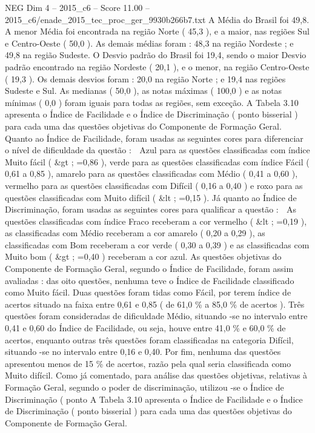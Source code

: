 \begin{textsample}{NEG Dim 4 – 2015\_c6 – Score 11.00 – 2015\_c6/enade\_2015\_tec\_proc\_ger\_9930b266b7.txt}
A Média do Brasil foi 49,8.
A menor Média foi encontrada na região Norte ( 45,3 ), e a maior, nas regiões Sul e Centro-Oeste ( 50,0 ).
As demais médias foram : 48,3 na região Nordeste ; e 49,8 na região Sudeste.
O Desvio padrão do Brasil foi 19,4, sendo o maior Desvio padrão encontrado na região Nordeste ( 20,1 ), e o menor, na região Centro-Oeste ( 19,3 ).
Os demais desvios foram : 20,0 na região Norte ; e 19,4 nas regiões Sudeste e Sul.
As medianas ( 50,0 ), as notas máximas ( 100,0 ) e as notas mínimas ( 0,0 ) foram iguais para todas as regiões, sem exceção.
A Tabela 3.10 apresenta o Índice de Facilidade e o Índice de Discriminação ( ponto bisserial ) para cada uma das questões objetivas do Componente de Formação Geral.
Quanto ao Índice de Facilidade, foram usadas as seguintes cores para diferenciar o nível de dificuldade da questão :  Azul para as questões classificadas com índice Muito fácil ( \&gt ; =0,86 ), verde para as questões classificadas com índice Fácil ( 0,61 a 0,85 ), amarelo para as questões classificadas com Médio ( 0,41 a 0,60 ), vermelho para as questões classificadas com Difícil ( 0,16 a 0,40 ) e roxo para as questões classificadas com Muito difícil ( \&lt ; =0,15 ).
Já quanto ao Índice de Discriminação, foram usadas as seguintes cores para qualificar a questão :  As questões classificadas com índice Fraco receberam a cor vermelho ( \&lt ; =0,19 ), as classificadas com Médio receberam a cor amarelo ( 0,20 a 0,29 ), as classificadas com Bom receberam a cor verde ( 0,30 a 0,39 ) e as classificadas com Muito bom ( \&gt ; =0,40 ) receberam a cor azul.
As questões objetivas do Componente de Formação Geral, segundo o Índice de Facilidade, foram assim avaliadas : das oito questões, nenhuma teve o Índice de Facilidade classificado como Muito fácil.
Duas questões foram tidas como Fácil, por terem índice de acertos situado na faixa entre 0,61 e 0,85 ( de 61,0 \% a 85,0 \% de acertos ).
Três questões foram consideradas de dificuldade Médio, situando -se no intervalo entre 0,41 e 0,60 do Índice de Facilidade, ou seja, houve entre 41,0 \% e 60,0 \% de acertos, enquanto outras três questões foram classificadas na categoria Difícil, situando -se no intervalo entre 0,16 e 0,40.
Por fim, nenhuma das questões apresentou menos de 15 \% de acertos, razão pela qual seria classificada como Muito difícil.
Como já comentado, para análise das questões objetivas, relativas à Formação Geral, segundo o poder de discriminação, utilizou -se o Índice de Discriminação ( ponto A Tabela 3.10 apresenta o Índice de Facilidade e o Índice de Discriminação ( ponto bisserial ) para cada uma das questões objetivas do Componente de Formação Geral.

\end{textsample}
